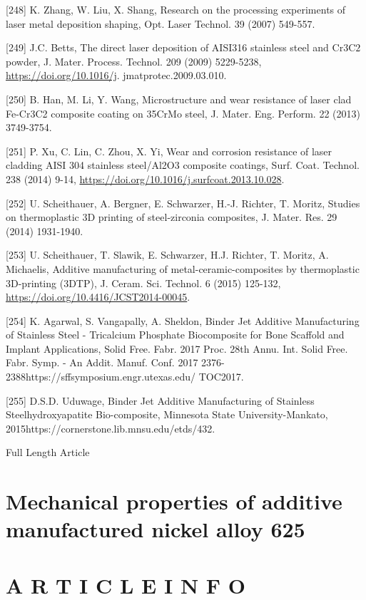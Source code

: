 \documentclass[10pt]{article}
\begin{document}
[248] K. Zhang, W. Liu, X. Shang, Research on the processing experiments of laser metal deposition shaping, Opt. Laser Technol. 39 (2007) 549-557.

[249] J.C. Betts, The direct laser deposition of AISI316 stainless steel and $\mathrm{Cr} 3 \mathrm{C} 2$ powder, J. Mater. Process. Technol. 209 (2009) 5229-5238, \href{https://doi.org/10.1016/j}{https://doi.org/10.1016/j}. jmatprotec.2009.03.010.

[250] B. Han, M. Li, Y. Wang, Microstructure and wear resistance of laser clad Fe-Cr3C2 composite coating on 35CrMo steel, J. Mater. Eng. Perform. 22 (2013) 3749-3754.

[251] P. Xu, C. Lin, C. Zhou, X. Yi, Wear and corrosion resistance of laser cladding AISI 304 stainless steel/Al2O3 composite coatings, Surf. Coat. Technol. 238 (2014) 9-14, \href{https://doi.org/10.1016/j.surfcoat.2013.10.028}{https://doi.org/10.1016/j.surfcoat.2013.10.028}.

[252] U. Scheithauer, A. Bergner, E. Schwarzer, H.-J. Richter, T. Moritz, Studies on thermoplastic 3D printing of steel-zirconia composites, J. Mater. Res. 29 (2014) 1931-1940.

[253] U. Scheithauer, T. Slawik, E. Schwarzer, H.J. Richter, T. Moritz, A. Michaelis, Additive manufacturing of metal-ceramic-composites by thermoplastic 3D-printing (3DTP), J. Ceram. Sci. Technol. 6 (2015) 125-132, \href{https://doi.org/10.4416/JCST2014-00045}{https://doi.org/10.4416/JCST2014-00045}.

[254] K. Agarwal, S. Vangapally, A. Sheldon, Binder Jet Additive Manufacturing of Stainless Steel - Tricalcium Phosphate Biocomposite for Bone Scaffold and Implant Applications, Solid Free. Fabr. 2017 Proc. 28th Annu. Int. Solid Free. Fabr. Symp. - An Addit. Manuf. Conf. 2017 2376-2388https://sffsymposium.engr.utexas.edu/ TOC2017.

[255] D.S.D. Uduwage, Binder Jet Additive Manufacturing of Stainless Steelhydroxyapatite Bio-composite, Minnesota State University-Mankato, 2015https://cornerstone.lib.mnsu.edu/etds/432.

Full Length Article

\section*{Mechanical properties of additive manufactured nickel alloy 625 }


\section*{A R T I C L E I N F O}
\end{document}
